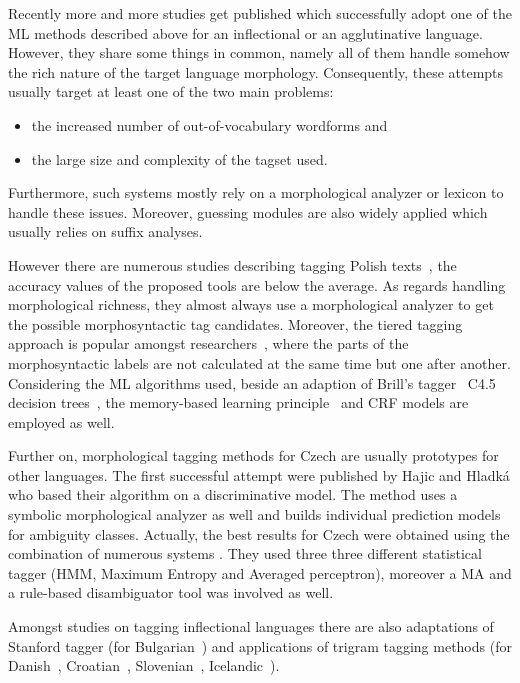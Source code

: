 Recently more and more studies get published which successfully adopt one of the ML methods  described above for an inflectional or an agglutinative language.
However, they share some things in common, namely all of them handle somehow the rich nature of the target language morphology.
Consequently, these attempts usually target at least one of the two main problems: 

\begin{itemize}
  \item the increased number of out-of-vocabulary wordforms and
  \item the large size and complexity of the tagset used.
\end{itemize}
Furthermore, such systems mostly rely on a morphological analyzer or lexicon to handle these issues.
Moreover, guessing modules are also widely applied which usually relies on suffix analyses.

However there are numerous studies describing tagging Polish texts~\cite{}, the accuracy values of the proposed tools are below the average.
As regards handling morphological richness, they almost always use a morphological analyzer to get the possible morphosyntactic tag candidates.
Moreover, the tiered tagging approach is popular amongst researchers~\cite{},  where the parts of the morphosyntactic labels are not calculated at the same time but one after another.
Considering the ML algorithms used, beside an adaption of Brill’s tagger~\cite{} C4.5 decision trees~\cite{}, the memory-based learning principle~\cite{} and CRF models are employed as well. 

Further on, morphological tagging methods for Czech are usually prototypes for other languages.
The first successful attempt were published by Hajic and Hladká \cite{Hajic1998a} who based their algorithm on a discriminative model.
The method  uses a symbolic morphological analyzer as well and builds individual prediction models for ambiguity classes.
Actually, the best results for Czech were obtained using the combination of numerous systems  \cite{Hajic2007}.
They used three three different statistical tagger (HMM, Maximum Entropy and Averaged perceptron), moreover a MA and a rule-based disambiguator tool was involved as well. 

Amongst studies on tagging inflectional languages there are also adaptations of Stanford tagger (for Bulgarian~\cite{}) and applications of trigram tagging methods (for Danish~\cite{}, Croatian~\cite{}, Slovenian~\cite{}, Icelandic~\cite{}).

